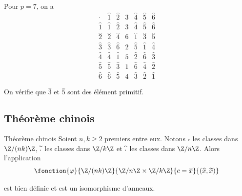 \begin{exemple}
    Pour $p = 7$, on a 
    \[
        \begin{array}{c|cccccc}
            \cdot & \widehat{1} & \widehat{2} & \widehat{3} & \widehat{4} & \widehat{5} & \widehat{6} \\
            \hline
            \widehat{1} & \widehat{1} & \widehat{2} & \widehat{3} & \widehat{4} & \widehat{5} & \widehat{6} \\
            \widehat{2} & \widehat{2} & \widehat{4} & \widehat{6} & \widehat{1} & \widehat{3} & \widehat{5} \\
            \widehat{3} & \widehat{3} & \widehat{6} & \widehat{2} & \widehat{5} & \widehat{1} & \widehat{4} \\
            \widehat{4} & \widehat{4} & \widehat{1} & \widehat{5} & \widehat{2} & \widehat{6} & \widehat{3} \\
            \widehat{5} & \widehat{5} & \widehat{3} & \widehat{1} & \widehat{6} & \widehat{4} & \widehat{2} \\
            \widehat{6} & \widehat{6} & \widehat{5} & \widehat{4} & \widehat{3} & \widehat{2} & \widehat{1} 
        \end{array}
    \]

    On vérifie que $\widehat 3$ et $\widehat 5$ sont des élément primitif.
\end{exemple}


\subsection{Théorème chinois }

\begin{theoreme}{Théorème chinois}{}
    Soient $n, k \geqslant 2$ premiers entre eux. Notons $\overline{.} \space $ les 
    classes dans $\Z / (n k) \Z$, $\widetilde{.}\space $ les classes dans $\Z / k \Z$ et 
    $\space \widehat{.} \space $ les classes dans $\Z / n \Z$.
    Alors l'application 
    $$\fonction{\varphi}{\Z / (n k) \Z}{\Z / n \Z \times \Z / k \Z}{c = \overline x}{(\widehat x, \widetilde x)}$$

    est bien définie et est un isomorphisme d'anneaux.
\end{theoreme}

